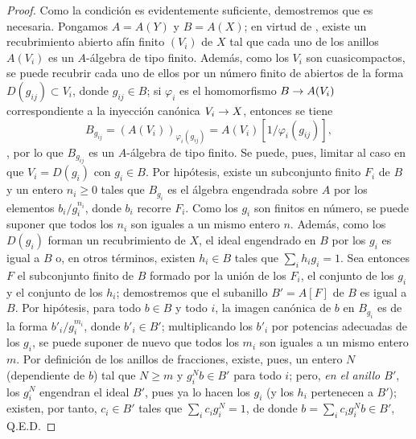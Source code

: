 \documentclass[oneside]{amsart}
\theoremstyle{ega-env-style}
\theoremstyle{ega-thm-env-style}
\theoremstyle{ega-defn-env-style}
\def\geq{\geqslant}                 %
\renewcommand{\to}{\mathchoice{\longrightarrow}{\rightarrow}{\rightarrow}{\rightarrow}}
\begin{document}
\begin{proof}
Como la condición es evidentemente suficiente, demostremos que es necesaria.
Pongamos $A=A(Y)$ y $B=A(X)$;
en virtud de , existe un recubrimiento abierto afín finito $(V_i)$ de $X$ tal que cada uno de los anillos $A(V_i)$ es un $A$-álgebra de tipo finito.
Además, como los $V_i$ son cuasicompactos, se puede recubrir cada uno de ellos por un número finito de abiertos de la forma $D(g_{ij})\subset V_i$, donde $g_{ij}\in B$;
si $\varphi_i$ es el homomorfismo $B\to A(V_i)$ correspondiente a la inyección canónica $V_i\to X$, entonces se tiene \[
  B_{g_{ij}}=(A(V_i))_{\varphi_i(g_{ij})}
  =A(V_i)[1/\varphi_i(g_{ij})],
\], por lo que $B_{g_{ij}}$ es un $A$-álgebra de tipo finito.
Se puede, pues, limitar al caso en que $V_i=D(g_i)$ con $g_i\in B$.
Por hipótesis, existe un subconjunto finito $F_i$ de $B$ y un entero $n_i\geq 0$ tales que $B_{g_i}$ es el álgebra engendrada sobre $A$ por los elementos $b_i/g_i^{n_i}$, donde $b_i$ recorre $F_i$.
Como los $g_i$ son finitos en número, se puede suponer que todos los $n_i$ son iguales a un mismo entero $n$.
Además, como los $D(g_i)$ forman un recubrimiento de $X$, el ideal engendrado en $B$ por los $g_i$ es igual a $B$ o, en otros términos, existen $h_i\in B$ tales que $\sum_i h_i g_i=1$.
Sea entonces $F$ el subconjunto finito de $B$ formado por la unión de los $F_i$, el conjunto de los $g_i$ y el conjunto de los $h_i$; demostremos que el subanillo $B'=A[F]$ de $B$ es igual a $B$.
Por hipótesis, para todo $b\in B$ y todo $i$, la imagen canónica de $b$ en $B_{g_i}$ es de la forma $b'_i/g_i^{m_i}$, donde $b'_i\in B'$;
multiplicando los $b'_i$ por potencias adecuadas de los $g_i$, se puede suponer de nuevo que todos los $m_i$ son iguales a un mismo entero $m$.
Por definición de los anillos de fracciones, existe, pues, un entero $N$ (dependiente de $b$) tal que $N\geq m$ y $g_i^N b\in B'$ para todo $i$;
pero, \emph{en el anillo $B'$}, los $g_i^N$ engendran el ideal $B'$, pues ya lo hacen los $g_i$ (y los $h_i$ pertenecen a $B'$);
existen, por tanto, $c_i\in B'$ tales que $\sum_i c_i g_i^N=1$, de donde $b=\sum_i c_i g_i^N b\in B'$, Q.E.D.
\end{proof}
\end{document}
